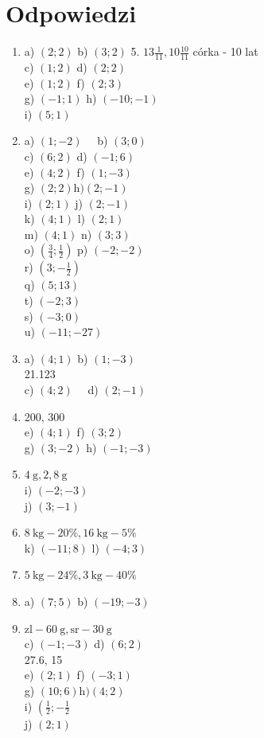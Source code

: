 \documentclass[10pt]{article}
\begin{document}
\section*{Odpowiedzi}
\begin{enumerate}
  \item a) \((2 ; 2)\) b) \((3 ; 2)\) 5. \(13 \frac{1}{11}, 10 \frac{10}{11}\) córka - 10 lat\\
c) \((1 ; 2)\) d) \((2 ; 2)\)\\
e) \((1 ; 2)\) f) \((2 ; 3)\)\\
g) \((-1 ; 1)\) h) \((-10 ;-1)\)\\
i) \((5 ; 1)\)
  \item a) \((1 ;-2) \quad\) b) \((3 ; 0)\)\\
c) \((6 ; 2)\) d) \((-1 ; 6)\)\\
e) \((4 ; 2)\) f) \((1 ;-3)\)\\
g) \((2 ; 2) \mathrm{h})(2 ;-1)\)\\
i) \((2 ; 1)\) j) \((2 ;-1)\)\\
k) \((4 ; 1)\) l) \((2 ; 1)\)\\
m) \((4 ; 1)\) n) \((3 ; 3)\)\\
o) \(\left(\frac{3}{4} ; \frac{1}{2}\right)\) p) \((-2 ;-2)\)\\
r) \(\left(3 ;-\frac{1}{2}\right)\)\\
q) \((5 ; 13)\)\\
t) \((-2 ; 3)\)\\
s) \((-3 ; 0)\)\\
u) \((-11 ;-27)\)
  \item a) \((4 ; 1)\) b) \((1 ;-3)\)\\
21.123\\
c) \((4 ; 2) \quad\) d) \((2 ;-1)\)
  \item 200, 300\\
e) \((4 ; 1)\) f) \((3 ; 2)\)\\
g) \((3 ;-2)\) h) \((-1 ;-3)\)
  \item \(4 \mathrm{~g}, 2,8 \mathrm{~g}\)\\
i) \((-2 ;-3)\)\\
j) \((3 ;-1)\)
  \item \(8 \mathrm{~kg}-20 \%, 16 \mathrm{~kg}-5 \%\)\\
k) \((-11 ; 8)\) l) \((-4 ; 3)\)
  \item \(5 \mathrm{~kg}-24 \%, 3 \mathrm{~kg}-40 \%\)
  \item a) \((7 ; 5)\) b) \((-19 ;-3)\)
  \item \(\mathrm{zl}-60 \mathrm{~g}, \mathrm{sr}-30 \mathrm{~g}\)\\
c) \((-1 ;-3)\) d) \((6 ; 2)\)\\
27.6, 15\\
e) \((2 ; 1)\) f) \((-3 ; 1)\)\\
g) \((10 ; 6) \mathrm{h})(4 ; 2)\)\\
i) \(\left(\frac{1}{2} ;-\frac{1}{2}\right.\)\\
j) \((2 ; 1)\)
\end{enumerate}
\end{document}
